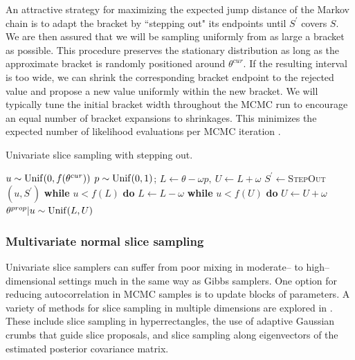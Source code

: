 An attractive strategy for maximizing the expected jump distance of the Markov chain is to adapt the bracket by ``stepping out" its endpoints until $ S^\prime $ covers $ S $. We are then assured that we will be sampling uniformly from as large a bracket as possible. This procedure preserves the stationary distribution as long as the approximate bracket is randomly positioned around $ \theta^{cur} $. If the resulting interval is too wide, we can shrink the corresponding bracket endpoint to the rejected value and propose a new value uniformly within the new bracket. We will typically tune the initial bracket width throughout the MCMC run to encourage an equal number of bracket expansions to shrinkages. This minimizes the expected number of likelihood evaluations per MCMC iteration \cite{tibbits2014automated}.

\begin{algorithm}[htbp]
	\caption{Univariate slice sampling with stepping out.}\label{alg:univar_slice}
	\begin{algorithmic}[1]
		\State $ u \sim \mathrm{Unif}(0,f(\theta^{cur})) $
		\State $ p\sim \mathrm{Unif}(0,1) $; $ L \gets \theta - \omega p,\ U \gets L+\omega $ 
		\State $ S^\prime \gets $\textsc{StepOut}$ (u,S^\prime) $ 
		\State\hspace{\algorithmicindent}\textbf{while }{$ u<f(L) $} \textbf{do} $ L \gets L-\omega $
		\State\hspace{\algorithmicindent}\textbf{while }{$u<f(U)$} \textbf{do} $ U \gets U+\omega $
		\State $ \theta^{prop}|u\sim\mathrm{Unif}(L,U) $ 
		\State\Return{$ \new{\theta} $}
		\Else{}
		\EndIf 	
		\EndIf
		\EndProcedure
	\end{algorithmic}
\end{algorithm}

\subsubsection{Multivariate normal slice sampling}
\label{subsubsec:mvn_slice_sampling}

Univariate slice samplers can suffer from poor mixing in moderate-- to high--dimensional settings much in the same way as Gibbs samplers. One option for reducing autocorrelation in MCMC samples is to update blocks of parameters. A variety of methods for slice sampling in multiple dimensions are explored in \cite{neal2003slice,thompson2011slice,tibbits2014automated}. These include slice sampling in hyperrectangles, the use of adaptive Gaussian crumbs that guide slice proposals, and slice sampling along eigenvectors of the estimated posterior covariance matrix. 

